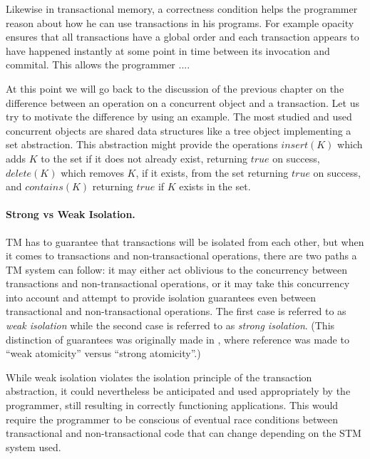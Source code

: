 Likewise in transactional memory, a correctness condition helps the
programmer reason about how he can use transactions in his programs.
For example opacity ensures that all transactions have a global order
and each transaction appears to have happened instantly at some point
in time between its invocation and commital.
This allows the programmer ....

At this point we will go back to the discussion of the previous chapter
on the difference between an operation on a concurrent object
and a transaction.
Let us try to motivate the difference by using an example.
The most studied and used concurrent objects are shared data structures
like a tree object implementing a set abstraction.
This abstraction might provide the operations $insert(K)$
which adds $K$ to the set if it does not already exist, returning $true$
on success, $delete(K)$ which removes $K$, if it exists, from the set
returning $true$ on success, and $contains(K)$ returning $true$ if $K$
exists in the set.


\paragraph{Strong vs Weak Isolation.}
TM has to guarantee that transactions will be isolated from each other, but
when it  comes to transactions and non-transactional  operations, there are
two  paths a  TM system  can follow:  it may  either act  oblivious  to the
concurrency between transactions and non-transactional 
operations, or  it may  take this concurrency  into account and  attempt to
provide     isolation    guarantees    even   between    transactional   and
non-transactional operations. The first  case is  referred to as \emph{weak
isolation} while the second case is referred to as \emph{strong  
isolation}.  (This  distinction  of   guarantees  was  originally  made  in
\cite{blundell06},  where   reference  was  made   to  {}``weak
atomicity'' versus {}``strong atomicity''.) 

While weak isolation  violates the isolation principle of
the  transaction abstraction, it could nevertheless be anticipated and used
appropriately by the  
programmer,  still resulting  in correctly  functioning  applications. This
would require the programmer 
to  be conscious  of  eventual race  conditions  between transactional  and
non-transactional code that can change depending on the STM system used.  


